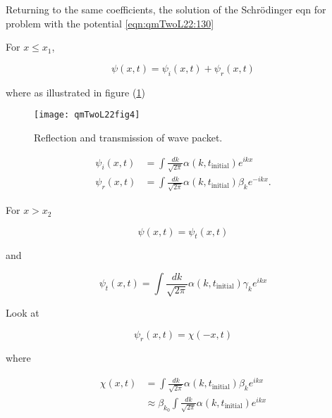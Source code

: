 Returning to the same coefficients, the solution of the Schr\"{o}dinger eqn for problem with the potential \ref{eqn:qmTwoL22:130}

For $x \le x_1$,

\begin{equation}\label{eqn:qmTwoL22:190}
\psi(x, t) = \psi_i(x, t) + \psi_r(x, t)
\end{equation}

where as illustrated in figure (\ref{fig:qmTwoL22:qmTwoL22fig4})
\begin{figure}[htp]
   \centering
   \texttt{[image: qmTwoL22fig4]}
   \caption{Reflection and transmission of wave packet.}\label{fig:qmTwoL22:qmTwoL22fig4}
\end{figure}

\begin{align}\label{eqn:qmTwoL22:210}
\psi_i(x, t) &= \int \frac{dk}{\sqrt{2 \pi}} \alpha(k, t_{\text{initial}}) e^{i k x} \\
\psi_r(x, t) &= \int \frac{dk}{\sqrt{2 \pi}} \alpha(k, t_{\text{initial}}) \beta_k e^{-i k x}.
\end{align}

For $x > x_2$

\begin{equation}\label{eqn:qmTwoL22:250}
\psi(x, t) = \psi_t(x, t)
\end{equation}

and

\begin{equation}\label{eqn:qmTwoL22:230}
\psi_t(x, t) = \int \frac{dk}{\sqrt{2 \pi}} \alpha(k, t_{\text{initial}}) \gamma_k e^{i k x}
\end{equation}

Look at

\begin{equation}\label{eqn:qmTwoL22:270}
\psi_r(x, t) = \chi(-x, t)
\end{equation}

where

\begin{equation}\label{eqn:qmTwoL22:290}
\begin{aligned}
\chi(x, t)
&= \int \frac{dk}{\sqrt{2 \pi}} \alpha(k, t_{\text{initial}}) \beta_k e^{i k x} \\
&\approx
\beta_{k_0} \int \frac{dk}{\sqrt{2 \pi}} \alpha(k, t_{\text{initial}}) e^{i k x}
\end{aligned}
\end{equation}

